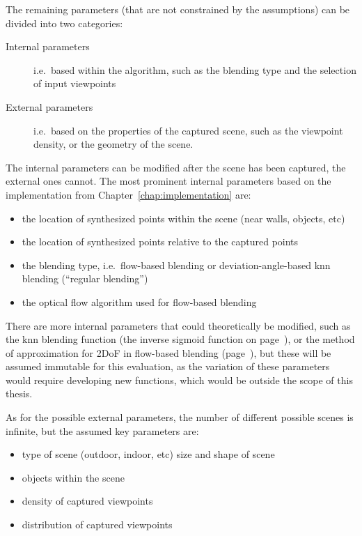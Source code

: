 The remaining parameters (that are not constrained by the assumptions) can be divided into two categories: 
\begin{description}
    \item [Internal parameters] i.e.\ based within the algorithm, such as the blending type and the selection of input viewpoints
    \item [External parameters] i.e.\ based on the properties of the captured scene, such as the viewpoint density, or the geometry of the scene.
\end{description}      

The internal parameters can be modified after the scene has been captured, the external ones cannot.  The most prominent internal parameters based on the implementation from Chapter~\ref{chap:implementation} are:

\begin{itemize}
  \item the location of synthesized points within the scene (near walls, objects, etc)
  \item the location of synthesized points relative to the captured points
  \item the blending type, i.e.\ flow-based blending or deviation-angle-based knn blending (``regular blending'')
  \item the optical flow algorithm used for flow-based blending
\end{itemize}

There are more internal parameters that could theoretically be modified, such as the knn blending function (the inverse sigmoid function on page~\pageref{eq:sigmoid}), or the method of approximation for 2DoF in flow-based blending (page~\pageref{subsec:2dof_flow-based}), but these will be assumed immutable for this evaluation, as the variation of these parameters would require developing new functions, which would be outside the scope of this thesis.

As for the possible external parameters, the number of different possible scenes is infinite, but the assumed key parameters are:
\begin{itemize}
  \item type of scene (outdoor, indoor, etc) \ar size and shape of scene
  \item objects within the scene
  \item density of captured viewpoints
  \item distribution of captured viewpoints
\end{itemize}

